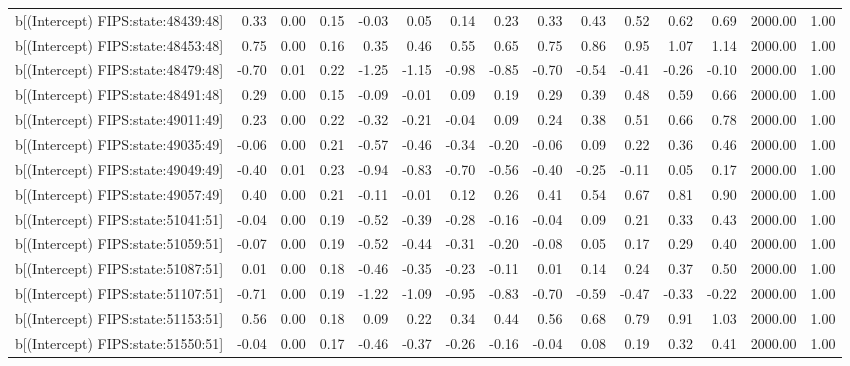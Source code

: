 \begin{table}[ht]
\begin{tabular}{rrrrrrrrrrrrrrr}
  b[(Intercept) FIPS:state:48439:48] & 0.33 & 0.00 & 0.15 & -0.03 & 0.05 & 0.14 & 0.23 & 0.33 & 0.43 & 0.52 & 0.62 & 0.69 & 2000.00 & 1.00 \\ 
  b[(Intercept) FIPS:state:48453:48] & 0.75 & 0.00 & 0.16 & 0.35 & 0.46 & 0.55 & 0.65 & 0.75 & 0.86 & 0.95 & 1.07 & 1.14 & 2000.00 & 1.00 \\ 
  b[(Intercept) FIPS:state:48479:48] & -0.70 & 0.01 & 0.22 & -1.25 & -1.15 & -0.98 & -0.85 & -0.70 & -0.54 & -0.41 & -0.26 & -0.10 & 2000.00 & 1.00 \\ 
  b[(Intercept) FIPS:state:48491:48] & 0.29 & 0.00 & 0.15 & -0.09 & -0.01 & 0.09 & 0.19 & 0.29 & 0.39 & 0.48 & 0.59 & 0.66 & 2000.00 & 1.00 \\ 
  b[(Intercept) FIPS:state:49011:49] & 0.23 & 0.00 & 0.22 & -0.32 & -0.21 & -0.04 & 0.09 & 0.24 & 0.38 & 0.51 & 0.66 & 0.78 & 2000.00 & 1.00 \\ 
  b[(Intercept) FIPS:state:49035:49] & -0.06 & 0.00 & 0.21 & -0.57 & -0.46 & -0.34 & -0.20 & -0.06 & 0.09 & 0.22 & 0.36 & 0.46 & 2000.00 & 1.00 \\ 
  b[(Intercept) FIPS:state:49049:49] & -0.40 & 0.01 & 0.23 & -0.94 & -0.83 & -0.70 & -0.56 & -0.40 & -0.25 & -0.11 & 0.05 & 0.17 & 2000.00 & 1.00 \\ 
  b[(Intercept) FIPS:state:49057:49] & 0.40 & 0.00 & 0.21 & -0.11 & -0.01 & 0.12 & 0.26 & 0.41 & 0.54 & 0.67 & 0.81 & 0.90 & 2000.00 & 1.00 \\ 
  b[(Intercept) FIPS:state:51041:51] & -0.04 & 0.00 & 0.19 & -0.52 & -0.39 & -0.28 & -0.16 & -0.04 & 0.09 & 0.21 & 0.33 & 0.43 & 2000.00 & 1.00 \\ 
  b[(Intercept) FIPS:state:51059:51] & -0.07 & 0.00 & 0.19 & -0.52 & -0.44 & -0.31 & -0.20 & -0.08 & 0.05 & 0.17 & 0.29 & 0.40 & 2000.00 & 1.00 \\ 
  b[(Intercept) FIPS:state:51087:51] & 0.01 & 0.00 & 0.18 & -0.46 & -0.35 & -0.23 & -0.11 & 0.01 & 0.14 & 0.24 & 0.37 & 0.50 & 2000.00 & 1.00 \\ 
  b[(Intercept) FIPS:state:51107:51] & -0.71 & 0.00 & 0.19 & -1.22 & -1.09 & -0.95 & -0.83 & -0.70 & -0.59 & -0.47 & -0.33 & -0.22 & 2000.00 & 1.00 \\ 
  b[(Intercept) FIPS:state:51153:51] & 0.56 & 0.00 & 0.18 & 0.09 & 0.22 & 0.34 & 0.44 & 0.56 & 0.68 & 0.79 & 0.91 & 1.03 & 2000.00 & 1.00 \\ 
  b[(Intercept) FIPS:state:51550:51] & -0.04 & 0.00 & 0.17 & -0.46 & -0.37 & -0.26 & -0.16 & -0.04 & 0.08 & 0.19 & 0.32 & 0.41 & 2000.00 & 1.00 \\ 

\end{tabular}
\end{table}
